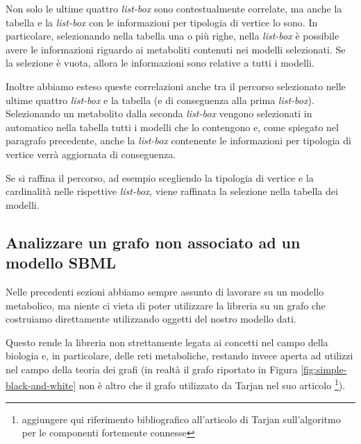 Non solo le ultime quattro \emph{list-box} sono contestualmente
correlate, ma anche la tabella e la \emph{list-box} con le
informazioni per tipologia di vertice lo sono. In particolare,
selezionando nella tabella una o pi\`u righe, nella \emph{list-box}
\`e possibile avere le informazioni riguardo ai metaboliti contenuti
nei modelli selezionati. Se la selezione \`e vuota, allora le
informazioni sono relative a tutti i modelli.

Inoltre abbiamo esteso queste correlazioni anche tra il percorso
selezionato nelle ultime quattro \emph{list-box} e la tabella (e di
conseguenza alla prima \emph{list-box}). Selezionando un metabolito
dalla seconda \emph{list-box} vengono selezionati in automatico nella
tabella tutti i modelli che lo contengono e, come spiegato nel
paragrafo precedente, anche la \emph{list-box} contenente le
informazioni per tipologia di vertice verr\`a aggiornata di
conseguenza.

Se si raffina il percorso, ad esempio scegliendo la tipologia di
vertice e la cardinalit\`a nelle rispettive \emph{list-box}, viene
raffinata la selezione nella tabella dei modelli.

\subsection{Analizzare un grafo non associato ad un modello SBML}
Nelle precedenti sezioni abbiamo sempre assunto di lavorare su un
modello metabolico, ma niente ci vieta di poter utilizzare la libreria
su un grafo che costruiamo direttamente utilizzando oggetti del nostro
modello dati.

Questo rende la libreria non strettamente legata ai concetti nel campo
della biologia e, in particolare, delle reti metaboliche, restando
invece aperta ad utilizzi nel campo della teoria dei grafi (in
realt\`a il grafo riportato in Figura \ref{fig:simple-black-and-white}
non \`e altro che il grafo utilizzato da Tarjan nel suo articolo
\footnote{aggiungere qui riferimento bibliografico all'articolo di
  Tarjan sull'algoritmo per le componenti fortemente connesse}).


